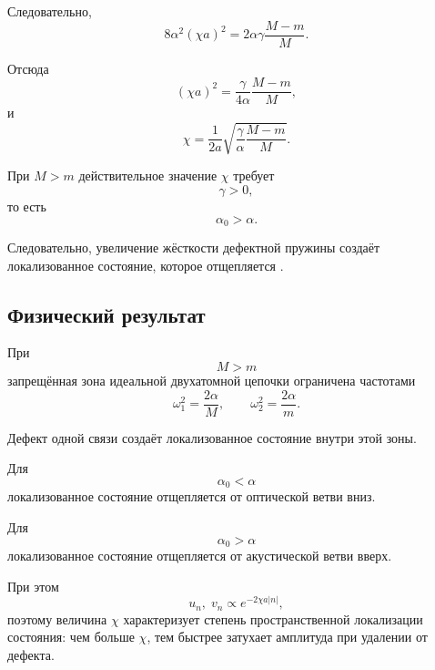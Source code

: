 \documentclass[../final.tex]{subfiles}
\begin{document}
Следовательно,
%
\begin{equation*}
    8\alpha^2(\chi a)^2
    =
    2\alpha\gamma
    \frac{M-m}{M}.
\end{equation*}
%

Отсюда
%
\begin{equation*}
    (\chi a)^2
    =
    \frac{\gamma}{4\alpha}
    \frac{M-m}{M},
\end{equation*}
%
и
%
\begin{equation*}
    \chi
    =
    \frac{1}{2a}
    \sqrt{
        \frac{\gamma}{\alpha}
        \frac{M-m}{M}
    }.
\end{equation*}
%

При $M>m$ действительное значение $\chi$
требует
%
\begin{equation*}
    \gamma>0,
\end{equation*}
%
то есть
%
\begin{equation*}
    \alpha_0>\alpha.
\end{equation*}
%

Следовательно, увеличение жёсткости дефектной пружины
создаёт локализованное состояние,
которое отщепляется
.



\subsection*{Физический результат}

При
%
\begin{equation*}
    M>m
\end{equation*}
%
запрещённая зона идеальной двухатомной цепочки
ограничена частотами
%
\begin{equation*}
    \omega_1^2
    =
    \frac{2\alpha}{M},
    \qquad
    \omega_2^2
    =
    \frac{2\alpha}{m}.
\end{equation*}
%

Дефект одной связи создаёт локализованное состояние
внутри этой зоны.

Для
%
\begin{equation*}
    \alpha_0<\alpha
\end{equation*}
%
локализованное состояние отщепляется
от оптической ветви вниз.

Для
%
\begin{equation*}
    \alpha_0>\alpha
\end{equation*}
%
локализованное состояние отщепляется
от акустической ветви вверх.

При этом
%
\begin{equation*}
    u_n,\;v_n
    \propto
    e^{-2\chi a|n|},
\end{equation*}
%
поэтому величина $\chi$ характеризует
степень пространственной локализации состояния:
чем больше $\chi$, тем быстрее затухает амплитуда
при удалении от дефекта.
\end{document}
